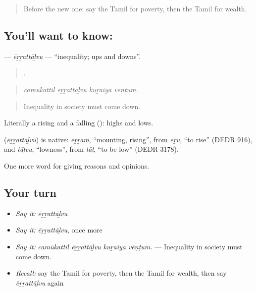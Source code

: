 \label{lesson:TA-C370-errattalvu}



\begin{quote}
Before the new one: say the Tamil for poverty, then the Tamil for wealth.
\end{quote}

\subsection*{You'll want to know: }
\textbf{} — \emph{ēṟṟattāḻvu} — \textquotedblleft{}inequality; ups and downs\textquotedblright{}.

\begin{quote}
   .
\end{quote}

\begin{quote}
\emph{camūkattil ēṟṟattāḻvu kuṟaiya vēṇṭum.}
\end{quote}

\begin{quote}
Inequality in society must come down.
\end{quote}

Literally a rising and a falling (): highs and lows.

\begin{cousinweb}
\textbf{} (\emph{ēṟṟattāḻvu}) is native: \emph{ēṟṟam}, \textquotedblleft{}mounting, rising\textquotedblright{}, from \emph{ēṟu}, \textquotedblleft{}to rise\textquotedblright{} (DEDR 916), and \emph{tāḻvu}, \textquotedblleft{}lowness\textquotedblright{}, from \emph{tāḻ}, \textquotedblleft{}to be low\textquotedblright{} (DEDR 3178).
\end{cousinweb}

\begin{grammarlens}[title={What you've built}]
One more word for giving reasons and opinions.
\end{grammarlens}

\subsection*{Your turn}
\begin{itemize}
\raggedright
  \item \emph{Say it:} \emph{ēṟṟattāḻvu}
  \item \emph{Say it:} \emph{ēṟṟattāḻvu}, once more
  \item \emph{Say it:} \emph{camūkattil ēṟṟattāḻvu kuṟaiya vēṇṭum.} — Inequality in society must come down.
  \item \emph{Recall:} say the Tamil for poverty, then the Tamil for wealth, then say \emph{ēṟṟattāḻvu} again
\end{itemize}

